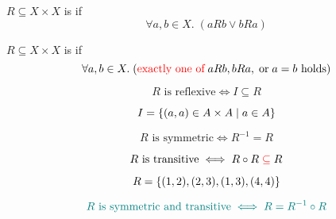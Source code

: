 \begin{frame}{}
  \begin{definition}
    $R \subseteq X \times X$ is  if
    \[
      \forall a, b \in X.\; (a R b \lor b R a)
    \]
  \end{definition}

  \pause
  \vspace{0.60cm}
  \begin{definition}
    $R \subseteq X \times X$ is  if
    \[
      \forall a, b \in X.\;
        (\text{\textcolor{red}{exactly one of}}\; a R b, b R a, \;\text{or}\; a = b \text{ holds})
    \]
  \end{definition}
\end{frame}

\begin{frame}
  \begin{theorem}
    \[
      R \text{ is reflexive} \iff I \subseteq R
    \]
  \end{theorem}
  \[
    I = \{(a, a) \in A \times A \mid a \in A\}
  \]

  \pause
  \vspace{0.60cm}
  \begin{theorem}
    \[
      R \text{ is symmetric} \iff R^{-1} = R
    \]
  \end{theorem}
\end{frame}

\begin{frame}{}
  \begin{theorem}
    \[
      R \text{ is transitive} \iff R \circ R \;\textcolor{red}{\subseteq}\; R
    \]
  \end{theorem}

  \pause
  \[
    R = \{(1, 2), (2, 3), (1, 3), (4, 4)\}
  \]
\end{frame}

\begin{frame}{}
  \begin{theorem}
    \[
      \textcolor{teal}{R \text{ is symmetric and transitive} \iff R = R^{-1} \circ R}
    \]
  \end{theorem}
\end{frame}
